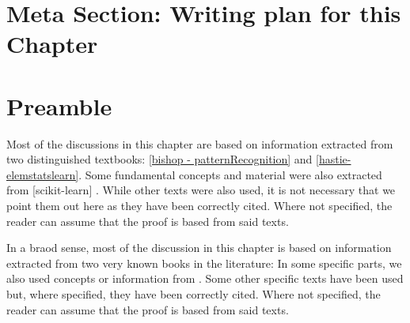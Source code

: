 \section{Meta Section: Writing plan for this Chapter}

\section{Preamble}\label{section-preamble}
Most of the discussions in this chapter are based on information extracted from two distinguished textbooks: \ref{bishop - patternRecognition} and  \ref{hastie-elemstatslearn}. Some fundamental concepts and material were also extracted from [scikit-learn] . While other texts were also used, it is not necessary that we point them out here as they have been correctly cited. Where not specified, the reader can assume that the proof is based from said texts.

In a braod sense, most of the discussion in this chapter is based on information extracted from two very known books in the literature:  In some specific parts, we also used concepts or information from \label{scikit-learn} . Some other specific texts have been used but, where specified, they have been correctly cited.
Where not specified, the reader can assume that the proof is based from said texts.